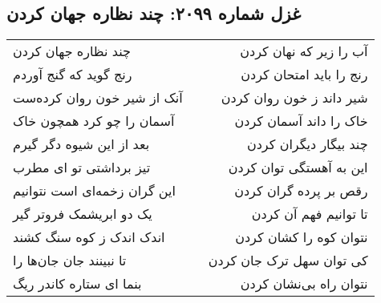 \begin{center}
\section*{غزل شماره ۲۰۹۹: چند نظاره جهان کردن}
\label{sec:2099}
\begin{longtable}{l p{0.5cm} r}
چند نظاره جهان کردن
&&
آب را زیر که نهان کردن
\\
رنج گوید که گنج آوردم
&&
رنج را باید امتحان کردن
\\
آنک از شیر خون روان کرده‌ست
&&
شیر داند ز خون روان کردن
\\
آسمان را چو کرد همچون خاک
&&
خاک را داند آسمان کردن
\\
بعد از این شیوه دگر گیرم
&&
چند بیگار دیگران کردن
\\
تیز برداشتی تو ای مطرب
&&
این به آهستگی توان کردن
\\
این گران زخمه‌ای است نتوانیم
&&
رقص بر پرده گران کردن
\\
یک دو ابریشمک فروتر گیر
&&
تا توانیم فهم آن کردن
\\
اندک اندک ز کوه سنگ کشند
&&
نتوان کوه را کشان کردن
\\
تا نبینند جان جان‌ها را
&&
کی توان سهل ترک جان کردن
\\
بنما ای ستاره کاندر ریگ
&&
نتوان راه بی‌نشان کردن
\\
\end{longtable}
\end{center}
